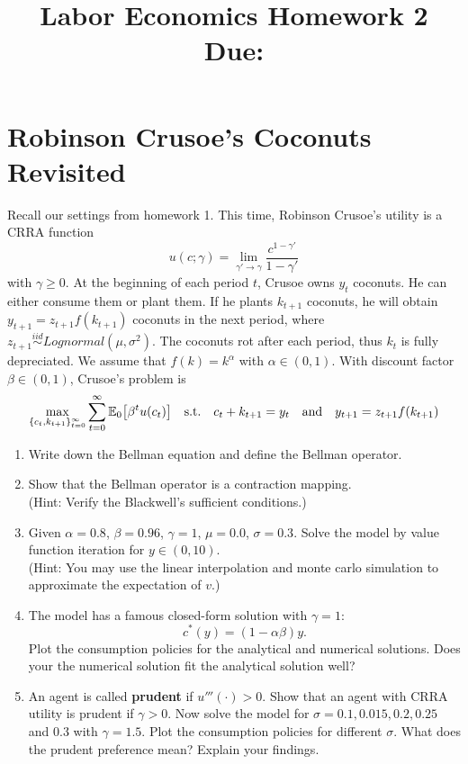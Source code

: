 \documentclass[12pt]{article}
\title{
    Labor Economics Homework 2 \\
    \large Due: \\
    }
\author{}
\date{}
\begin{document}

\maketitle

\section{Robinson Crusoe's Coconuts Revisited}
Recall our settings from homework 1. This time, 
Robinson Crusoe's utility is a CRRA function 
\begin{equation*}
    u(c; \gamma) = \lim_{\gamma'\to\gamma}\frac{c^{1-\gamma'}}{1-\gamma'}
\end{equation*}
with $\gamma\geq 0$. At the beginning of each period 
$t$, Crusoe owns $y_t$ coconuts. He 
can either consume them or plant them. If he plants 
$k_{t+1}$ coconuts, he will obtain $y_{t+1} = 
z_{t+1}f(k_{t+1})$ coconuts in the next period, where 
$z_{t+1}\overset{iid}{\sim} Lognormal(\mu,\sigma^2)$. 
The coconuts rot after each period, thus $k_t$ 
is fully depreciated. We assume that $f(k) = 
k^\alpha$ with $\alpha \in (0,1)$. With discount 
factor $\beta\in(0,1)$, Crusoe's problem is 
\begin{equation*}
    \max_{\{c_t,k_{t+1}\}_{t=0}^\infty} \sum_{t=0}^\infty 
    \E_0\sbrc{\beta^t u(c_t)} \quad \text{s.t.} \quad 
    c_t + k_{t+1} = y_t \quad \text{and} \quad y_{t+1} = 
    z_{t+1}f(k_{t+1})
\end{equation*} 
\begin{enumerate}
    \item Write down the Bellman equation and define the Bellman operator. 
    \item Show that the Bellman operator is a contraction mapping.\\
    (Hint: Verify the Blackwell's sufficient conditions.)
    \item Given $\alpha = 0.8$, $\beta = 0.96$, $\gamma = 1$, $\mu = 0.0$, $\sigma = 0.3$. 
    Solve the model by value function iteration for $y\in(0,10)$.\\
    (Hint: You may use the linear interpolation and monte carlo simulation to 
    approximate the expectation of $v$.)
    \item The model has a famous closed-form solution with $\gamma = 1$:
    \begin{equation*}
        c^*(y) = (1-\alpha\beta)y.
    \end{equation*}
    Plot the consumption policies for the analytical and numerical solutions. 
    Does your the numerical solution fit the analytical solution well?
    \item An agent is called \textbf{prudent} if $u'''(\cdot) > 0$. Show that 
    an agent with CRRA utility is prudent if $\gamma > 0$. Now solve the model 
    for $\sigma = 0.1, 0.015, 0.2, 0.25$ and $0.3$ with $\gamma = 1.5$. 
    Plot the consumption policies for different $\sigma$. What does the 
    prudent preference mean? Explain your findings.
\end{enumerate}
\end{document}
